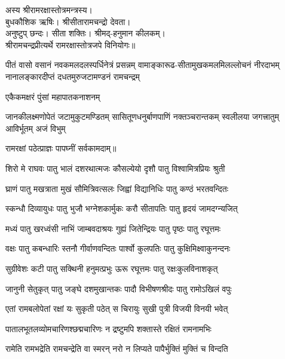 
\clearpage
{}
अस्य श्रीरामरक्षास्तोत्रमन्त्रस्य।\\
बुधकौशिक ऋषिः। श्रीसीतारामचन्द्रो देवता।\\
अनुष्टुप् छन्दः। सीता शक्तिः। श्रीमद्-हनुमान कीलकम्।\\
श्रीरामचन्द्रप्रीत्यर्थे रामरक्षास्तोत्रजपे विनियोगः॥

{पीतं वासो वसानं नवकमलदलस्पर्धिनेत्रं प्रसन्नम्}
{वामाङ्कारूढ-सीतामुखकमलमिलल्लोचनं नीरदाभम्}
{नानालङ्कारदीप्तं दधतमुरुजटामण्डनं रामचन्द्रम्}

{एकैकमक्षरं पुंसां महापातकनाशनम्}

{जानकीलक्ष्मणोपेतं जटामुकुटमण्डितम्}
{सासितूणधनुर्बाणपाणिं नक्तञ्चरान्तकम्}
{स्वलीलया जगत्त्रातुम् आविर्भूतम् अजं विभुम्}

{रामरक्षां पठेत्प्राज्ञः पापघ्नीं सर्वकामदाम्॥}

\resetShloka

\twolineshloka
{शिरो मे राघवः पातु भालं दशरथात्मजः}
{कौसल्येयो दृशौ पातु विश्वामित्रप्रियः श्रुती}

\twolineshloka
{घ्राणं पातु मखत्राता मुखं सौमित्रिवत्सलः}
{जिह्वां विद्यानिधिः पातु कण्ठं भरतवन्दितः}

\twolineshloka
{स्कन्धौ दिव्यायुधः पातु भुजौ भग्नेशकार्मुकः}
{करौ सीतापतिः पातु हृदयं जामदग्न्यजित्}

\twolineshloka
{मध्यं पातु खरध्वंसी नाभिं जाम्बवदाश्रयः}
{गुह्यं जितेन्द्रियः पातु पृष्ठः पातु रघूत्तमः}

\twolineshloka
{वक्षः पातु कबन्धारिः स्तनौ गीर्वाणवन्दितः}
{पार्श्वो कुलपतिः पातु कुक्षिमिक्ष्वाकुनन्दनः}

\twolineshloka
{सुग्रीवेशः कटी पातु सक्थिनी हनुमत्प्रभुः}
{ऊरू रघूत्तमः पातु रक्षःकुलविनाशकृत्}

\twolineshloka
{जानुनी सेतुकृत् पातु जङ्घे दशमुखान्तकः}
{पादौ विभीषणश्रीदः पातु रामोऽखिलं वपुः}

\twolineshloka
{एतां रामबलोपेतां रक्षां यः सुकृती पठेत्}
{स चिरायुः सुखी पुत्री विजयी विनयी भवेत्}

\twolineshloka
{पातालभूतलव्योमचारिणश्छद्मचारिणः}
{न द्रष्टुमपि शक्तास्ते रक्षितं रामनामभिः}

\twolineshloka
{रामेति रामभद्रेति रामचन्द्रेति वा स्मरन्}
{नरो न लिप्यते पापैर्भुक्तिं मुक्तिं च विन्दति}

